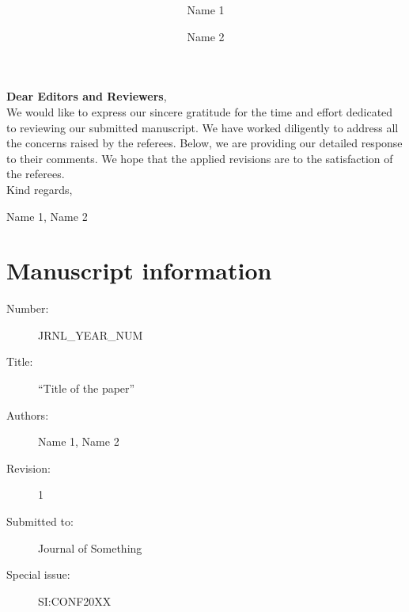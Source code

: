 \documentclass{article}
\author[1]{Name 1}
\author[2]{Name 2}
\affil[1]{University 1, City 1, Country 1}
\affil[2]{University 3, City 2, Country 2}
\date{}
\title{\textbf{\PaperTitle}}
\def\PaperTitle{Title of the paper}
\def\PaperId{{JRNL\_YEAR\_NUM}}
\def\PaperRevision{1}
\def\SpecialIssueId{{SI:CONF20XX}}
\def\Journal{{Journal of Something}}
\def\Authors{Name 1, Name 2}
\begin{document}
  
  \maketitle
  
  \noindent \textbf{Dear Editors and Reviewers},
  \\[2em]
  \indent We would like to express our sincere gratitude for the time and effort dedicated to reviewing our submitted manuscript. 
  We have worked diligently to address all the concerns raised by the referees.
  Below, we are providing our detailed response to their comments.
  We hope that the applied revisions are to the satisfaction of the referees.
  \\[2em]
  Kind regards,
  \begin{flushright}
    \Authors
  \end{flushright}
  \vfill
  \section*{Manuscript information}
  \begin{description}
    \item[Number:] \PaperId
    \item[Title:] ``\PaperTitle''
    \item[Authors:] \Authors
    \item[Revision:] \PaperRevision
    \item[Submitted to:] \Journal
    \item[Special issue:] \SpecialIssueId
  \end{description}
  \pagebreak
  
  {
    \hypersetup{linkcolor=black}
    \tableofcontents
    \pagebreak
  }

  
  
  
\end{document}

